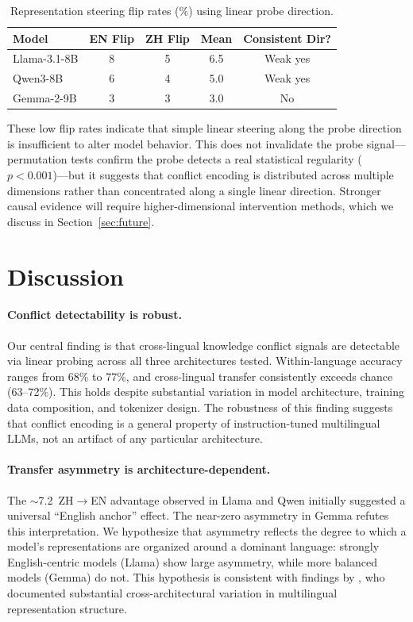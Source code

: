\documentclass[11pt]{article}
\newcommand{\pp}{\,\text{pp}}
\begin{document}
\begin{table}[t]
\centering
\caption{Representation steering flip rates (\%) using linear probe direction.}
\label{tab:steering}
\begin{tabular}{lcccc}
\toprule
Model & EN Flip & ZH Flip & Mean & Consistent Dir? \\
\midrule
Llama-3.1-8B & 8 & 5 & 6.5 & Weak yes \\
Qwen3-8B     & 6 & 4 & 5.0 & Weak yes \\
Gemma-2-9B   & 3 & 3 & 3.0 & No \\
\bottomrule
\end{tabular}
\end{table}

These low flip rates indicate that simple linear steering along the probe direction is insufficient to alter model behavior.
This does not invalidate the probe signal---permutation tests confirm the probe detects a real statistical regularity ($p < 0.001$)---but it suggests that conflict encoding is distributed across multiple dimensions rather than concentrated along a single linear direction.
Stronger causal evidence will require higher-dimensional intervention methods, which we discuss in Section~\ref{sec:future}.

\section{Discussion}

\paragraph{Conflict detectability is robust.}
Our central finding is that cross-lingual knowledge conflict signals are detectable via linear probing across all three architectures tested.
Within-language accuracy ranges from 68\% to 77\%, and cross-lingual transfer consistently exceeds chance (63--72\%).
This holds despite substantial variation in model architecture, training data composition, and tokenizer design.
The robustness of this finding suggests that conflict encoding is a general property of instruction-tuned multilingual LLMs, not an artifact of any particular architecture.

\paragraph{Transfer asymmetry is architecture-dependent.}
The $\sim$7.2\pp{} ZH$\to$EN advantage observed in Llama and Qwen initially suggested a universal ``English anchor'' effect.
The near-zero asymmetry in Gemma refutes this interpretation.
We hypothesize that asymmetry reflects the degree to which a model's representations are organized around a dominant language: strongly English-centric models (Llama) show large asymmetry, while more balanced models (Gemma) do not.
This hypothesis is consistent with findings by \citet{wendler2024llamas}, who documented substantial cross-architectural variation in multilingual representation structure.
\end{document}
